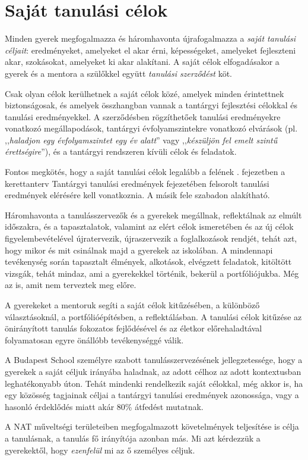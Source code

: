 \section{Saját tanulási célok}
\label{sec:tanulasi_celok}

Minden gyerek megfogalmazza és háromhavonta újrafogalmazza a \emph{saját
      tanulási céljait}: eredményeket, amelyeket el akar érni, képességeket,
amelyeket fejleszteni akar, szokásokat, amelyeket ki akar alakítani. A saját
célok elfogadásakor a gyerek és a mentora a szülőkkel együtt \emph{tanulási
      szerződést} köt.

Csak olyan célok kerülhetnek a saját célok közé, amelyek
minden érintettnek biztonságosak, és amelyek összhangban vannak a tantárgyi
fejlesztési célokkal és tanulási eredményekkel. A szerződésben rögzíthetőek
tanulási eredményekre
vonatkozó megállapodások,
tantárgyi évfolyamszintekre vonatkozó elvárások (pl. ,,\emph{haladjon egy
      évfolyamszintet egy év alatt}'' vagy ,,\emph{készüljön fel emelt szintű
      érettségire}''), és a tantárgyi rendszeren kívüli célok és
feladatok.

Fontos megkötés, hogy a saját tanulási célok legalább a felének
\ifkerettanterv
      . fejezetben
\else
      a kerettanterv Tantárgyi tanulási eredmények fejezetében
\fi
felsorolt tanulási eredmények elérésére kell vonatkoznia. A másik
fele szabadon alakítható.

Háromhavonta a tanulásszervezők és a gyerekek megállnak, reflektálnak az elmúlt
időszakra, és a tapasztalatok, valamint az elért célok ismeretében és az új
célok figyelembevételével újratervezik, újraszervezik a foglalkozások rendjét,
tehát azt, hogy mikor és mit csinálnak majd a gyerekek az iskolában.
A mindennapi tevékenység során tapasztalt élmények, alkotások, elvégzett
feladatok, kitöltött vizsgák, tehát mindaz, ami a gyerekekkel történik, bekerül
a portfóliójukba. Még az is, amit nem terveztek meg előre.

A gyerekeket a mentoruk segíti a saját célok kitűzésében, a különböző
választásoknál, a portfólióépítésben, a reflektálásban. A tanulási célok
kitűzése az önirányított tanulás fokozatos fejlődésével és az életkor
előrehaladtával folyamatosan egyre önállóbb tevékenységgé válik. 

A Budapest School személyre szabott tanulásszervezésének jellegzetessége, hogy
a gyerekek a saját céljuk irányába haladnak, az adott célhoz az adott
kontextusban leghatékonyabb úton. Tehát mindenki rendelkezik saját célokkal,
még akkor is, ha egy közösség tagjainak céljai a tantárgyi tanulási eredmények
azonossága, vagy a hasonló érdeklődés miatt akár  80\% átfedést mutatnak.

A NAT műveltségi területeiben megfogalmazott követelmények teljesítése is célja
a tanulásnak, a tanulás fő irányítója azonban más. Mi azt kérdezzük a
gyerekektől, hogy \emph{ezenfelül} mi az ő személyes céljuk.